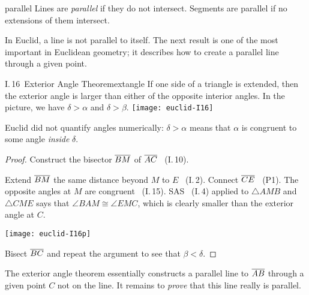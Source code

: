 \goodbreak



\begin{defn}{}{parallel}
	Lines are \emph{parallel} if they do not intersect. Segments are parallel if no extensions of them intersect.
\end{defn}

In Euclid, a line is not parallel to itself. The next result is one of the most important in Euclidean geometry; it describes how to create a parallel line through a given point.


\begin{thm}[lower separated=false, sidebyside, sidebyside align=top seam, sidebyside gap=0pt, righthand width=0.37\linewidth]{I.\,16\ Exterior Angle Theorem}{extangle}
	If one side of a triangle is extended, then the exterior angle is larger than either of the opposite interior angles.\smallbreak
	In the picture, we have $\delta>\alpha$ and $\delta>\beta$.
	\tcblower
	\flushright\texttt{[image: euclid-I16]}
\end{thm}

Euclid did not quantify angles numerically: $\delta>\alpha$ means that $\alpha$ is congruent to some angle \emph{inside} $\delta$.

\begin{proof}
	Construct the bisector $\overline{BM}$ of $\overline{AC}$ \ (I.\,10).\par
	\begin{minipage}[t]{0.62\linewidth}\vspace{-5pt}
		Extend $\overline{BM}$ the same distance beyond $M$ to $E$ \ (I.\,2).\smallbreak
		Connect $\overline{CE}$ \ (P1).\smallbreak
		The opposite angles at $M$ are congruent \ (I.\,15).\smallbreak
		SAS \ (I.\,4) applied to $\triangle AMB$ and $\triangle CME$ says that $\angle BAM\cong\angle EMC$, which is clearly smaller than the exterior angle at $C$.
	\end{minipage}
	\hfill
	\begin{minipage}[t]{0.37\linewidth}\vspace{-20pt}
		\flushright\texttt{[image: euclid-I16p]}
	\end{minipage}
	\smallbreak
	Bisect $\overline{BC}$ and repeat the argument to see that $\beta<\delta$.
\end{proof}


The exterior angle theorem essentially constructs a parallel line to $\overline{AB}$ through a given point $C$ not on the line. It remains to \emph{prove} that this line really is parallel.

